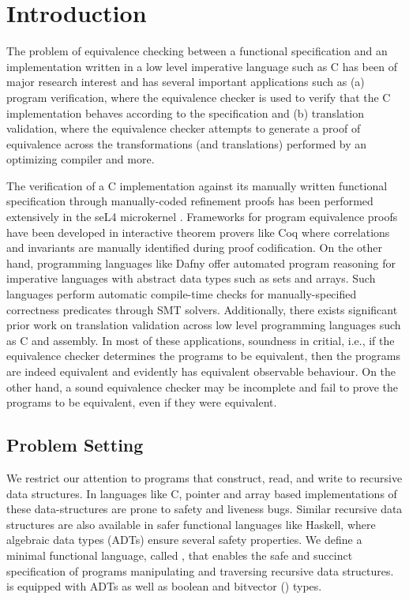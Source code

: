\section{Introduction}
\label{sec:intro}
The problem of equivalence checking between a functional specification and an
implementation written in a low level imperative language such as C
has been of major research interest
and has several important applications such as (a) program verification, where
the equivalence checker is used to verify that the C implementation
behaves according to the specification and (b) translation validation, where
the equivalence checker attempts to generate a proof of equivalence across
the transformations (and translations) performed by an optimizing compiler
and more.

The verification of a C implementation against its manually written
functional specification through manually-coded refinement proofs has been
performed extensively in the seL4 microkernel \cite{seL4}.
Frameworks for program equivalence proofs have been developed in interactive
theorem provers like Coq \cite{programEquivalenceInCoq} where correlations and invariants
are manually identified during proof codification.
On the other hand, programming languages like Dafny \cite{dafny} offer automated program
reasoning for imperative languages with abstract data types such as sets and arrays.
Such languages perform automatic compile-time checks for manually-specified
correctness predicates through SMT solvers.
Additionally, there exists significant prior work on translation validation
\cite{tvi,tristan_tv_eqsat11,stepp_eqsat_llvm11,eqsat,pec,zuck03,zuck05,heffter05,covac,c_to_verilog,kanade09,lopes16,tvoc_cav05,ddec,semalign,oopsla20,tv_oskernel,namjoshi13}
across low level programming languages such as C and assembly.
In most of these applications, soundness in critial,
i.e., if the equivalence checker determines the programs to be equivalent, then the programs are indeed equivalent
and evidently has equivalent observable behaviour. On the other hand, a sound equivalence checker may be incomplete
and fail to prove the programs to be equivalent, even if they were equivalent.

\subsection{Problem Setting}
We restrict our attention to programs that construct, read, and write
to recursive data structures. In languages like C, pointer and array based
implementations of these data-structures are prone to safety and liveness bugs.
Similar recursive data structures are also available in safer functional languages like Haskell,
where algebraic data types (ADTs) \cite{hope} ensure several safety properties.
We define a minimal functional language, called \SpecL{}, that enables the safe
and succinct specification of programs manipulating and traversing recursive data structures.
\SpecL{} is equipped with ADTs as well as boolean and bitvector () types.

